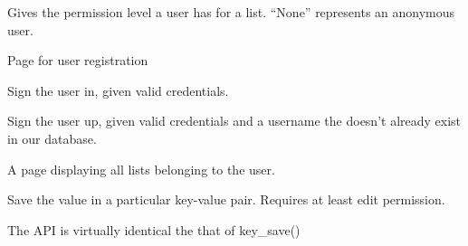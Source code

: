 \documentclass[letterpaper,10pt,english]{sphinxmanual}
\begin{document}

\begin{fulllineitems}
\label{index:routes.query_permission}
Gives the permission level a user has for a list.
``None'' represents an anonymous user.

\end{fulllineitems}


\begin{fulllineitems}
\label{index:routes.register}
Page for user registration

\end{fulllineitems}


\begin{fulllineitems}
\label{index:routes.signin}
Sign the user in, given valid credentials.

\end{fulllineitems}


\begin{fulllineitems}
\label{index:routes.signup}
Sign the user up, given valid credentials and a username the doesn't
already exist in our database.

\end{fulllineitems}


\begin{fulllineitems}
\label{index:routes.userlists}
A page displaying all lists belonging to the user.

\end{fulllineitems}


\begin{fulllineitems}
\label{index:routes.value_save}
Save the value in a particular key-value pair. Requires
at least edit permission.

The API is virtually identical the that of key\_save()

\end{fulllineitems}
\end{document}
